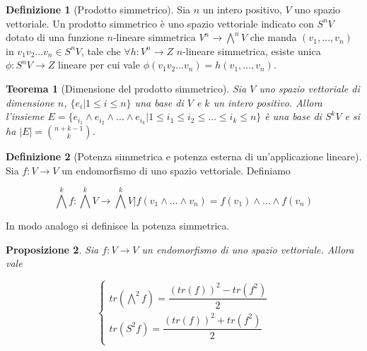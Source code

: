 \documentclass[11pt]{article}
\theoremstyle{plain}
\newtheorem{thm}{Teorema}[section]
\newtheorem{prop}[thm]{Proposizione}
\theoremstyle{definition}
\newtheorem{defn}{Definizione}[section]
\theoremstyle{remark}
\begin{document}
\begin{defn}[Prodotto simmetrico]

Sia $n$ un intero positivo, $V$ uno spazio vettoriale. Un prodotto simmetrico è uno spazio vettoriale indicato con $S^n V$
dotato di una funzione $n$-lineare simmetrica $V^n \to \bigwedge^n V$ che manda $(v_1,\ldots,v_n)$ in 
$v_1 v_2\ldots v_n \in S^n V$, tale che $\forall h: V^n \to Z$ $n$-lineare simmetrica, 
esiste unica $\phi: S^n V \to Z $ lineare per cui vale $\phi(v_1 v_2 \ldots v_n)=h(v_1,\ldots,v_n)$.

\label{defn:prodotto simmetrico}
\end{defn}





\begin{thm}[Dimensione del prodotto simmetrico]

Sia $V$ uno spazio vettoriale di dimensione $n$, $\{e_i| 1 \leq i \leq n\}$ una base di $V$ e $k$ un intero positivo.
Allora l'insieme $E=\{e_{i_1} \wedge e_{i_2}\wedge\ldots \wedge e_{i_k}| 1 \leq i_1 \leq i_2 \leq\ldots\leq i_k \leq n\}$ è una base di $S^k V$ 
e si ha $|E|= \binom {n+k-1}{k}$.

\label{thm:prodotto simmetrico}
\end{thm}


\begin{defn}[Potenza simmetrica e potenza esterna di un'applicazione lineare]

Sia $f: V\to V$ un endomorfismo di uno spazio vettoriale. Definiamo 

\[\bigwedge^k f : \bigwedge^k V \to \bigwedge^k V | f(v_1 \wedge \ldots \wedge v_n) = f(v_1) \wedge \ldots \wedge f(v_n) \]

In modo analogo si definisce la potenza simmetrica.


\end{defn}




\begin{prop}
Sia $f: V \to V$ un endomorfismo di uno spazio vettoriale. Allora vale

\[ 
\begin{cases}
tr(\bigwedge^2 f ) = \dfrac{(tr(f))^2 - tr(f^2)}{2} \\
tr(S^2 f ) = \dfrac{(tr(f))^2 + tr(f^2)}{2} \\
\end{cases}
\]



\end{prop}
\end{document}
